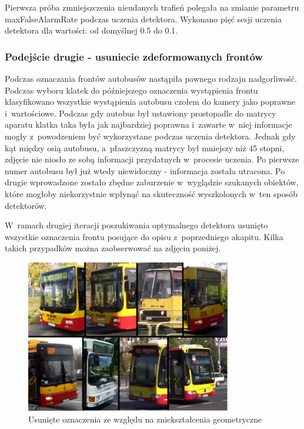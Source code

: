 Pierwsza próba zmniejszczenia nieudanych trafień polegała na zmianie 
parametru maxFalseAlarmRate podczas uczenia detektora. Wykonano pięć
sesji uczenia detektora dla wartości: od domyślnej 0.5 do 0.1.

\subsubsection{Podejście drugie - usuniecie zdeformowanych frontów}

Podczas oznaczania frontów autobusów nastąpiła pawnego rodzaju
nadgorliwość. Podczas wyboru klatek do późniejszego oznaczenia
wystąpienia frontu klasyfikowano wszystkie wystąpienia autobusu
czołem do kamery jako poprawne i~wartościowe. Podczas gdy autobus
był ustawiony prostopadle do matrycy aparatu klatka taka była
jak najbardziej poprawna i~zawarte w~niej informacje mogły
z~powodzeniem być wykorzystane podczas uczenia detektora. Jednak
gdy kąt między osią autobusu, a~płaszczyzną matrycy był mniejszy
niż 45 stopni, zdjęcie nie niosło ze sobą informacji przydatnych
w~procesie uczenia. Po pierwsze numer autobusu był już wtedy
niewidoczny - informacja została utracona. Po drugie wprowadzone
zostało zbędne zaburzenie w~wyglądzie szukanych obiektów,
które mogłoby niekorzystnie wpłynąć na skuteczność wyszkolonych
w~ten sposób detektorów.

W~ramach drugiej iteracji poszukiwania optymalnego detektora
usunięto wszystkie oznaczenia frontu posujące do opisu
z~poprzedniego akapitu. Kilka takich przypadków można
zaobserwować na zdjęciu poniżej.

\begin{figure}[h!]
    \centering
    \includegraphics[width=0.8\textwidth]{img/exp_removed_distorted_fronts}
    \caption{Usunięte oznaczenia ze względu na zniekształcenia geometryczne}
\end{figure}

